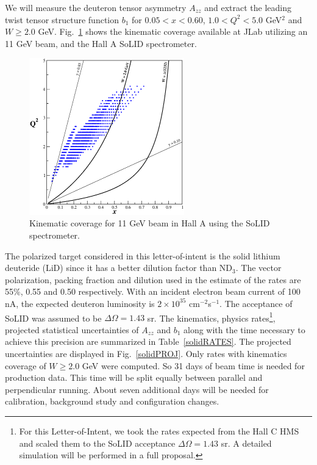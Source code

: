 %
%
%
We will measure the deuteron tensor asymmetry $A_{zz}$ and extract the leading twist tensor structure 
function $b_1$ for $0.05<x<0.60$, $1.0<Q^2<5.0$ GeV$^2$ and $W \ge 2.0$ GeV. Fig.~\ref{kincov} 
shows the kinematic coverage available at JLab utilizing an 11 GeV beam, and the Hall A SoLID 
spectrometer. 

\begin{figure}[h]
\begin{center}
\includegraphics[width=0.6\textwidth]{figs/solid/cov_solid.eps}
\caption{\label{kincov} Kinematic coverage for 11 GeV beam in Hall A using the SoLID spectrometer.}
\end{center}
\end{figure}

The polarized target considered in this letter-of-intent is the solid lithium deuteride (LiD) 
since it has a better dilution factor than ND$_3$. The vector polarization, packing fraction and 
dilution used in the estimate of the rates are 55\%, 0.55 and 0.50 respectively. With an incident 
electron beam current of 100 nA, the expected deuteron luminosity is $2\times 10^{35}$ cm$^{-2}$s$^{-1}$. 
The acceptance of SoLID was assumed to be $\Delta\Omega = 1.43$ sr. 
The kinematics, physics rates\footnote{For this Letter-of-Intent, we took the rates expected from the Hall C 
HMS and scaled them to the SoLID acceptance $\Delta \Omega = 1.43$ sr. A detailed simulation will be
performed in a full proposal.}, projected statistical uncertainties of $A_{zz}$ and $b_1$ along with the time 
necessary to achieve this precision are summarized in Table~\ref{solidRATES}. The projected uncertainties 
are displayed in Fig.~\ref{solidPROJ}. Only rates with kinematics coverage of $W \ge 2.0$ GeV were computed. 
So 31 days of beam time is needed for production data. This time will be split equally between parallel and 
perpendicular running. About seven additional days will be needed for calibration, background study and 
configuration changes.


